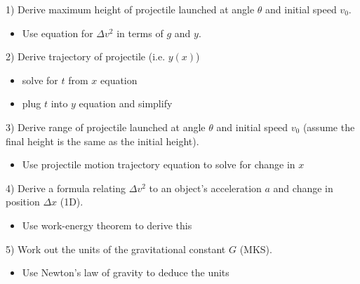 \documentclass{article}
\begin{document}
   

1) Derive maximum height of projectile launched at angle $\theta$ and initial speed $v_{0}$.
\begin{itemize}    
    \item Use equation for $\Delta v^2$ in terms of $g$ and $y$.
\end{itemize}

\newpage

2) Derive trajectory of projectile (i.e. $y(x)$)

\begin{itemize}
    \item solve for $t$ from $x$ equation
    \item plug $t$ into $y$ equation and simplify
\end{itemize}

\newpage 

3) Derive range of projectile launched at angle $\theta$ and initial speed $v_{0}$ (assume the final height is the same as the initial height).
\begin{itemize}
\item Use projectile motion trajectory equation to solve for change in $x$
\end{itemize}

\newpage


4) Derive a formula relating $\Delta v^2$ to an object's acceleration $a$ and change in position $\Delta x$ (1D).
\begin{itemize}
    \item Use work-energy theorem to derive this
\end{itemize}

\newpage

5) Work out the units of the gravitational constant $G$ (MKS).
\begin{itemize}
    \item Use Newton's law of gravity to deduce the units 
\end{itemize}
\end{document}
